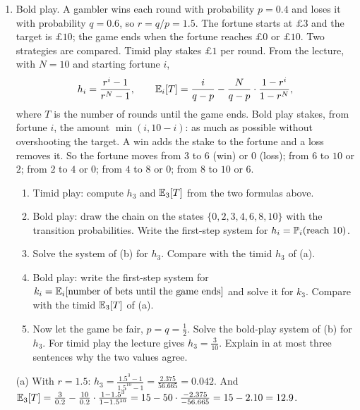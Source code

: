 \begin{enumerate}[resume*=quiz]
\begin{solution}
(e) Half of the paths reach $1$ by time $2.2$, but the waiting time of the other half has a heavy tail: $\Prob(T_1>t)=2\Phi(1/\sqrt t)-1\approx\sqrt{2/(\pi t)}$ decays only like $t^{-1/2}$. The mean is $\E[T_1]=\int_0^\infty\Prob(T_1>t)\dd t$, and $\int^\infty t^{-1/2}\dd t=\infty$. A median of $2.2$ and an infinite mean are consistent because the rare long waits are long enough to make the integral diverge.
\end{solution}

\item Bold play. A gambler wins each round with probability $p=0.4$ and loses it with probability $q=0.6$, so $r=q/p=1.5$. The fortune starts at $\pounds3$ and the target is $\pounds10$; the game ends when the fortune reaches $\pounds0$ or $\pounds10$. Two strategies are compared.
Timid play stakes $\pounds1$ per round. From the lecture, with $N=10$ and starting fortune $i$,
\[
h_i=\frac{r^i-1}{r^N-1},\qquad
\mathbb{E}_i[T]=\frac{i}{q-p}-\frac{N}{q-p}\cdot\frac{1-r^i}{1-r^N},
\]
where $T$ is the number of rounds until the game ends.
Bold play stakes, from fortune $i$, the amount $\min(i,10-i)$: as much as possible without overshooting the target. A win adds the stake to the fortune and a loss removes it. So the fortune moves from $3$ to $6$ (win) or $0$ (loss); from $6$ to $10$ or $2$; from $2$ to $4$ or $0$; from $4$ to $8$ or $0$; from $8$ to $10$ or $6$.
\begin{enumerate}[label=(\alph*),leftmargin=2em]
\item Timid play: compute $h_3$ and $\mathbb{E}_3[T]$ from the two formulas above.
\item Bold play: draw the chain on the states $\{0,2,3,4,6,8,10\}$ with the transition probabilities. Write the first-step system for $h_i=\mathbb{P}_i(\text{reach }10)$.
\item Solve the system of (b) for $h_3$. Compare with the timid $h_3$ of (a).
\item Bold play: write the first-step system for $k_i=\mathbb{E}_i[\text{number of bets until the game ends}]$ and solve it for $k_3$. Compare with the timid $\mathbb{E}_3[T]$ of (a).
\item Now let the game be fair, $p=q=\tfrac12$. Solve the bold-play system of (b) for $h_3$. For timid play the lecture gives $h_3=\tfrac3{10}$. Explain in at most three sentences why the two values agree.
\end{enumerate}
\begin{solution}
(a) With $r=1.5$: $h_3=\frac{1.5^3-1}{1.5^{10}-1}=\frac{2.375}{56.665}=0.042$. And $\mathbb{E}_3[T]=\frac{3}{0.2}-\frac{10}{0.2}\cdot\frac{1-1.5^3}{1-1.5^{10}}=15-50\cdot\frac{-2.375}{-56.665}=15-2.10=12.9$.


\end{solution}
\end{enumerate}
